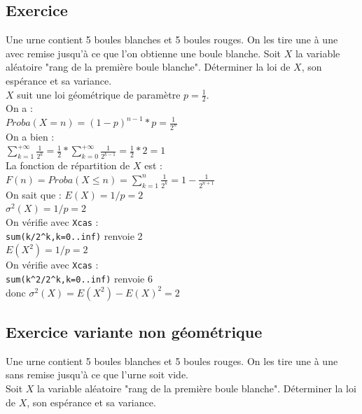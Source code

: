 \documentclass[a4paper,11pt]{book}
\begin{document}
\subsection{Exercice}
Une urne contient 5 boules blanches et 5 boules rouges. On les tire une \`a
une avec remise jusqu'\`a ce que l'on obtienne une boule blanche.
Soit $X$ la variable al\'eatoire "rang de la premi\`ere boule blanche".
D\'eterminer la loi de $X$, son esp\'erance et sa variance.\\

$X$ suit une loi g\'eom\'etrique de param\`etre $p=\frac{1}{2}$.\\
On a :\\
$Proba(X=n)=(1-p)^{n-1}*p=\frac{1}{2^n}$\\ 
On a bien :\\
$\sum_{k=1}^{+\infty} \frac{1}{2^k}=\frac{1}{2}*
\sum_{k=0}^{+\infty}\frac{1}{2^{k-1}}=\frac{1}{2}*2=1$\\
La fonction de r\'epartition de $X$ est :\\
$F(n)=Proba(X\leq n)=\sum_{k=1}^n\frac{1}{2^k}=1-\frac{1}{2^{n+1}}$\\
On sait que :
$E(X)=1/p=2$\\
$\sigma^2(X)=1/p=2$\\
On v\'erifie avec {\tt Xcas} :\\
{\tt sum(k/2\verb|^|k,k=0..inf)} renvoie 2\\
$E(X^2)=1/p=2$\\
On v\'erifie avec {\tt Xcas} :\\
{\tt sum(k\verb|^|2/2\verb|^|k,k=0..inf)} renvoie 6\\
donc $\sigma^2(X)=E(X^2)-E(X)^2=2$\\
\subsection{Exercice variante non g\'eom\'etrique}
Une urne contient 5 boules blanches et 5 boules rouges. On les tire une \`a
une sans remise jusqu'\`a ce que l'urne soit vide.\\
Soit $X$ la variable al\'eatoire "rang de la premi\`ere boule blanche".
D\'eterminer la loi de $X$, son esp\'erance et sa variance. 
\end{document}
